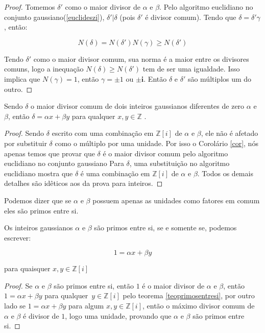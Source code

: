 \begin{proof}
	Tomemos $\delta'$ como o maior divisor de $\alpha$ e $\beta$. Pelo algoritmo euclidiano no conjunto gaussiano(\ref{euclideszi}), $\delta' | \delta$ (pois $\delta'$ \'e divisor comum). Tendo que $\delta = \delta' \gamma$, ent\~ao:

$$N(\delta) = N(\delta')N(\gamma) \geq N(\delta')$$

Tendo $\delta'$ como o maior divisor comum, sua norma \'e a maior entre os divisores comuns, logo a inequa\c{c}\~ao $N(\delta) \geq N(\delta')$ tem de ser uma igualdade. Isso implica que $N(\gamma) = 1$, ent\~ao $\gamma = \pm 1$ ou $\pm \textbf{i}$. Ent\~ao $\delta$ e $\delta'$ s\~ao m\'ultiplos um do outro.

\end{proof}

\begin{Th} \label{teoprimosentresi}
	Sendo $\delta$ o maior divisor comum de dois inteiros gaussianos diferentes de zero $\alpha$ e $\beta$, ent\~ao $\delta = \alpha x + \beta y$ para qualquer $x, y \in \mathbb{Z}$ .
\end{Th}

\begin{proof}
Sendo $\delta$ escrito com uma combina\c{c}\~ao em $\mathbb{Z}[i]$ de $\alpha$ e $\beta$, ele n\~ao \'e afetado por substituir $\delta$ como o m\'ultiplo por uma unidade. Por isso o Corol\'ario \ref{cor}, n\'os apenas temos que provar que $\delta$ \'e o maior divisor comum pelo algoritmo euclidiano no conjunto gaussiano Para $\delta$, uma substitui\c{c}\~ao no algoritmo euclidiano mostra que $\delta$ \'e uma combina\c{c}\~ao em $\mathbb{Z}[i]$ de $\alpha$ e $\beta$. Todos os demais detalhes s\~ao id\^eticos aos da prova para inteiros.

\end{proof}

Podemos dizer que se $\alpha$ e $\beta$ possuem apenas as unidades como fatores em comum eles s\~ao primos entre si. 

\begin{Cor} \label{primosentresi}

Os inteiros gaussianos $\alpha$ e $\beta$ s\~ao primos entre si, se e somente se, podemos escrever:

$$1 = \alpha x + \beta y$$

para quaisquer $x, y \in \mathbb{Z}[i]$

\end{Cor}

\begin{proof}

Se $\alpha$ e $\beta$ s\~ao primos entre si, ent\~ao $1$ \'e o maior divisor de $\alpha$ e $\beta$, ent\~ao $1 = \alpha x + \beta y$ para qualquer $\, y \in \mathbb{Z}[i]$  pelo teorema \ref{teoprimosentresi}, por outro lado se $1 = \alpha x + \beta y$ para algum $x, y \in \mathbb{Z}[i]$, ent\~ao o m\'aximo divisor comum de $\alpha$ e $\beta$ \'e divisor de $1$, logo uma unidade, provando que $\alpha$ e $\beta$ s\~ao primos entre si.

\end{proof}


